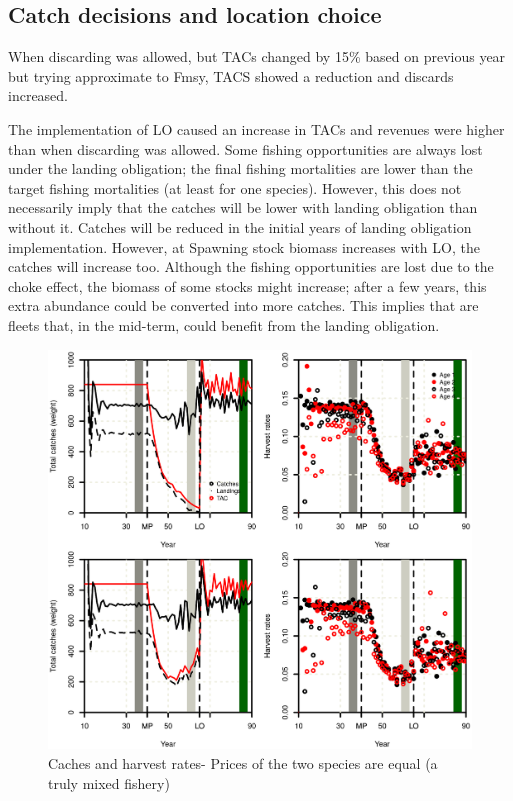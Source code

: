 \documentclass[12pt,oneline,a4paper,numbib]{ouparticle}
\numberwithin{equation}{subsection} %
\begin{document}
\subsection{Catch decisions and location choice}
\label{sec3.1}
When discarding was allowed, but TACs changed by 15\% based on previous year but trying approximate to Fmsy, TACS showed a reduction and discards increased. 

The implementation of LO caused an increase in TACs and revenues were higher than when discarding was allowed. Some fishing opportunities are always lost under the landing obligation; the final fishing mortalities are lower than the target fishing mortalities (at least for one species). However, this does not necessarily imply that the catches will be lower with landing obligation than without it. Catches will be reduced in the initial years of landing obligation implementation. However, at Spawning stock biomass increases with LO, the catches will increase too. Although the fishing opportunities are lost due to the choke effect, the biomass of some stocks might increase; after a few years, this extra abundance could be converted into more catches. This implies that are fleets that, in the mid-term, could benefit from the landing obligation.

\begin{figure}[!ht]
\centering
\includegraphics[width=.69\textwidth]{Figures/figurecatches.eps} 
\caption{Caches and harvest rates- Prices of the two species are equal (a truly mixed fishery)}
\end{figure}
\end{document}
